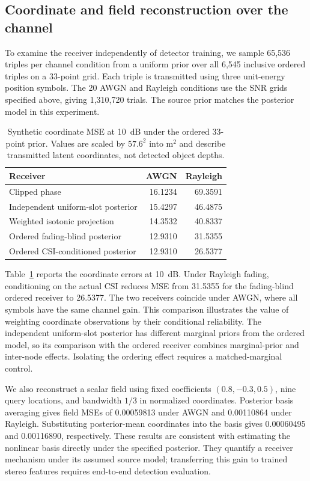 \documentclass[conference]{IEEEtran}
\begin{document}
\subsection{Coordinate and field reconstruction over the channel}
\label{sec:synthetic}
To examine the receiver independently of detector training, we sample
65,536 triples per channel condition from a uniform prior over all 6,545
inclusive ordered triples on a 33-point grid. Each triple is transmitted
using three unit-energy position symbols. The 20 AWGN and Rayleigh
conditions use the SNR grids specified above, giving 1,310,720 trials.
The source prior matches the posterior model in this experiment.

\begin{table}[t]
\centering
\caption{Synthetic coordinate MSE at 10~dB under the ordered 33-point
prior. Values are scaled by $57.6^2$ into m$^2$ and describe transmitted
latent coordinates, not detected object depths.}
\label{tab:receiver}
\begin{tabular}{lrr}
\toprule
Receiver & AWGN & Rayleigh\\
\midrule
Clipped phase & 16.1234 & 69.3591\\
Independent uniform-slot posterior & 15.4297 & 46.4875\\
Weighted isotonic projection & 14.3532 & 40.8337\\
Ordered fading-blind posterior & 12.9310 & 31.5355\\
Ordered CSI-conditioned posterior & 12.9310 & 26.5377\\
\bottomrule
\end{tabular}
\end{table}

Table~\ref{tab:receiver} reports the coordinate errors at 10~dB. Under
Rayleigh fading, conditioning on the actual CSI reduces MSE from 31.5355
for the fading-blind ordered receiver to 26.5377. The two receivers coincide
under AWGN, where all symbols have the same channel gain. This comparison
illustrates the value of weighting coordinate observations by their
conditional reliability. The independent uniform-slot posterior has
different marginal priors from the ordered model, so its comparison with
the ordered receiver combines marginal-prior and inter-node effects.
Isolating the ordering effect requires a matched-marginal control.

We also reconstruct a scalar field using fixed coefficients
$(0.8,-0.3,0.5)$, nine query locations, and bandwidth $1/3$ in normalized
coordinates. Posterior basis averaging gives field MSEs of 0.00059813
under AWGN and 0.00110864 under Rayleigh. Substituting posterior-mean
coordinates into the basis gives 0.00060495 and 0.00116890, respectively.
These results are consistent with estimating the nonlinear basis directly
under the specified posterior. They quantify a receiver mechanism under
its assumed source model; transferring this gain to trained stereo
features requires end-to-end detection evaluation.
\end{document}

